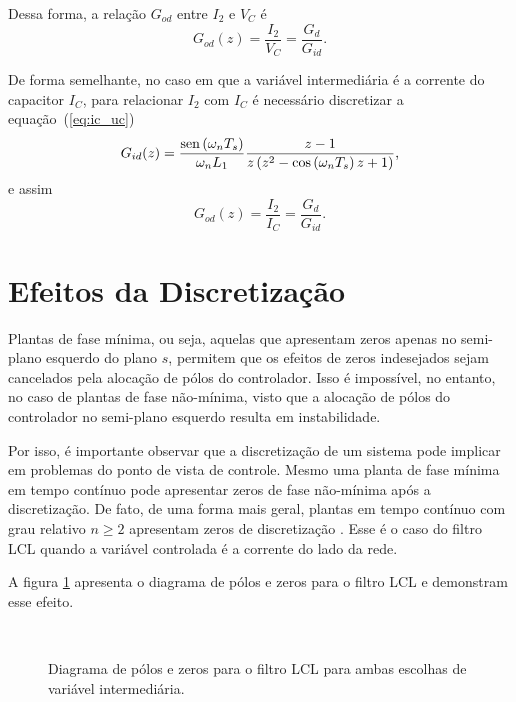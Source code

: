     Dessa forma, a relação $G_{od}$ entre $I_2$ e $V_C$ é
    \begin{equation}
        G_{od}(z) = \frac{I_2}{V_C} = \frac{G_d}{G_{id}} \text{.}
    \end{equation}

    De forma semelhante, no caso em que a variável intermediária é a corrente do
    capacitor $I_C$, para relacionar $I_2$ com $I_C$ é necessário discretizar a
    equação~(\ref{eq:ic_uc})
    \begin{equation}
        G_{id}(z) = \frac{\operatorname{sen} \left( \omega_n T_s \right)}{\omega_n L_1}
            \frac{z-1}{z \left( z^2 - \cos \left( \omega_n T_s \right) z + 1 \right)}
            \text{,}
    \end{equation}
    e assim
    \begin{equation}
        G_{od}(z) = \frac{I_2}{I_C} = \frac{G_d}{G_{id}} \text{.}
    \end{equation}


\section{Efeitos da Discretização}

    Plantas de fase mínima, ou seja, aquelas que apresentam zeros apenas no
    semi-plano esquerdo do plano $s$, permitem que os efeitos de zeros indesejados
    sejam cancelados pela alocação de pólos do controlador. Isso é impossível,
    no entanto, no caso de plantas de fase não-mínima, visto que a alocação de
    pólos do controlador no semi-plano esquerdo resulta em instabilidade.

    Por isso, é importante observar que a discretização de um sistema pode implicar
    em problemas do ponto de vista de controle. Mesmo uma planta de fase mínima em
    tempo contínuo pode apresentar zeros de fase não-mínima após a discretização.
    De fato, de uma forma mais geral, plantas em tempo contínuo com grau relativo
    $n \ge 2$ apresentam zeros de discretização \cite{ref:ASTROM}. Esse é o caso
    do filtro LCL quando a variável controlada é a corrente do lado da rede.


    A figura \ref{fig:pzmap_ic_vc} apresenta o diagrama de pólos e zeros para o
    filtro LCL e demonstram esse efeito.

    \begin{figure}[htb]
        \centering
        \\
        \renewcommand\figurename{Fig.}
        \caption{Diagrama de pólos e zeros para o filtro LCL para ambas escolhas
            de variável intermediária.}
        \label{fig:pzmap_ic_vc}
    \end{figure}


